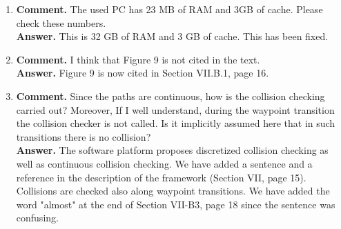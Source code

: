 \documentclass{article}
\begin{document}
\begin{enumerate}
\item \textbf{Comment.}   The used PC has 23 MB of RAM and 3GB of cache. Please
  check these numbers.\\
  \textbf{Answer.} This is 32 GB of RAM and 3 GB of cache. This has been fixed.

\item \textbf{Comment.} I think that Figure 9 is not cited in the text.\\
  \textbf{Answer.} Figure 9 is now cited in Section VII.B.1, page 16.
  
\item \textbf{Comment.}  Since the paths are continuous, how is the
  collision checking carried out? Moreover, If I well understand,
  during the waypoint transition the collision checker is not
  called. Is it implicitly assumed here that in such transitions there
  is no collision?\\
  \textbf{Answer.} The software platform proposes discretized
  collision checking as well as continuous collision checking. We have
  added a sentence and a reference in the description of the
  framework (Section VII, page 15). Collisions are checked also along waypoint
  transitions. We have added the word "almost" at the end of Section
  VII-B3, page 18 since the sentence was confusing.
\end{enumerate}
\end{document}

